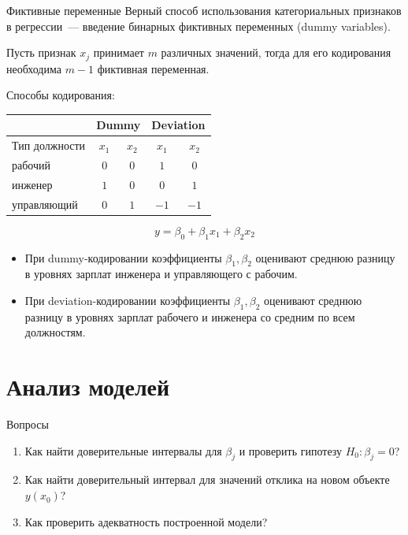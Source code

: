 \documentclass[9pt,pdf,utf8,hyperref={unicode},aspectratio=169]{beamer}
\begin{document}
\begin{frame}{Фиктивные переменные}
	Верный способ использования категориальных признаков в регрессии~--- введение бинарных фиктивных переменных (dummy variables).
	
	Пусть признак $x_j$ принимает $m$ различных значений, тогда для его кодирования необходима $m-1$ фиктивная переменная.
	
	\bigskip
	
	Способы кодирования:
	\begin{center}
		\begin{tabular}{|l|cc|cc|} \hline
			& \multicolumn{2}{c|}{Dummy}  & \multicolumn{2}{c|}{Deviation} \\\hline
			Тип должности &$x_1$&$x_2$&$x_1$&$x_2$ \\\hline
			рабочий       & $0$ & $0$ & $1$ & $0$ \\
			инженер       & $1$ & $0$ & $0$ & $1$ \\
			управляющий   & $0$ & $1$ &$-1$ &$-1$ \\ \hline
		\end{tabular}
	\end{center}
	
	\bigskip
	
	$$y = \beta_0 + \beta_1x_1 + \beta_2x_2$$
	
	\begin{itemize}
		\item При dummy-кодировании коэффициенты $\beta_1,\beta_2$ оценивают среднюю разницу в уровнях зарплат инженера и управляющего с рабочим.
		\item При deviation-кодировании коэффициенты $\beta_1,\beta_2$ оценивают среднюю разницу в уровнях зарплат рабочего и инженера со средним по всем должностям.
	\end{itemize}
\end{frame}

\section{Анализ моделей}
\begin{frame}{Вопросы}
    \begin{enumerate}
    \item Как найти доверительные интервалы для $\beta_j$ и проверить гипотезу $H_0\colon \beta_j=0$?
    \item Как найти доверительный интервал для значений отклика на новом объекте $y(x_0)$?
    \item Как проверить адекватность построенной модели?
    \end{enumerate}
\end{frame}
\end{document}
